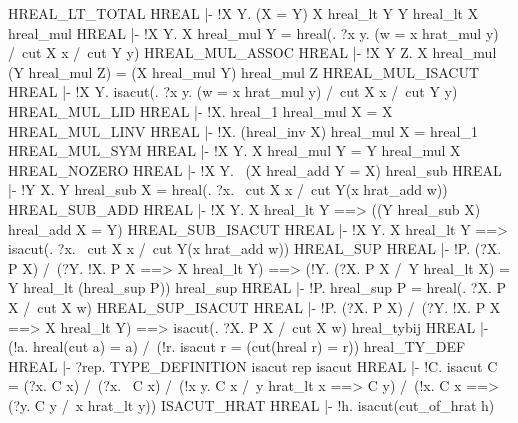 \ENDTHEOREM
\THEOREM HREAL\_LT\_TOTAL HREAL
|- !X Y. (X = Y) \/ X hreal_lt Y \/ Y hreal_lt X
\ENDTHEOREM
\THEOREM hreal\_mul HREAL
|- !X Y.
    X hreal_mul Y =
    hreal(\w. ?x y. (w = x hrat_mul y) /\ cut X x /\ cut Y y)
\ENDTHEOREM
\THEOREM HREAL\_MUL\_ASSOC HREAL
|- !X Y Z. X hreal_mul (Y hreal_mul Z) = (X hreal_mul Y) hreal_mul Z
\ENDTHEOREM
\THEOREM HREAL\_MUL\_ISACUT HREAL
|- !X Y. isacut(\w. ?x y. (w = x hrat_mul y) /\ cut X x /\ cut Y y)
\ENDTHEOREM
\THEOREM HREAL\_MUL\_LID HREAL
|- !X. hreal_1 hreal_mul X = X
\ENDTHEOREM
\THEOREM HREAL\_MUL\_LINV HREAL
|- !X. (hreal_inv X) hreal_mul X = hreal_1
\ENDTHEOREM
\THEOREM HREAL\_MUL\_SYM HREAL
|- !X Y. X hreal_mul Y = Y hreal_mul X
\ENDTHEOREM
\THEOREM HREAL\_NOZERO HREAL
|- !X Y. ~(X hreal_add Y = X)
\ENDTHEOREM
\THEOREM hreal\_sub HREAL
|- !Y X. Y hreal_sub X = hreal(\w. ?x. ~cut X x /\ cut Y(x hrat_add w))
\ENDTHEOREM
\THEOREM HREAL\_SUB\_ADD HREAL
|- !X Y. X hreal_lt Y ==> ((Y hreal_sub X) hreal_add X = Y)
\ENDTHEOREM
\THEOREM HREAL\_SUB\_ISACUT HREAL
|- !X Y.
    X hreal_lt Y ==> isacut(\w. ?x. ~cut X x /\ cut Y(x hrat_add w))
\ENDTHEOREM
\THEOREM HREAL\_SUP HREAL
|- !P.
    (?X. P X) /\ (?Y. !X. P X ==> X hreal_lt Y) ==>
    (!Y. (?X. P X /\ Y hreal_lt X) = Y hreal_lt (hreal_sup P))
\ENDTHEOREM
\THEOREM hreal\_sup HREAL
|- !P. hreal_sup P = hreal(\w. ?X. P X /\ cut X w)
\ENDTHEOREM
\THEOREM HREAL\_SUP\_ISACUT HREAL
|- !P.
    (?X. P X) /\ (?Y. !X. P X ==> X hreal_lt Y) ==>
    isacut(\w. ?X. P X /\ cut X w)
\ENDTHEOREM
\THEOREM hreal\_tybij HREAL
|- (!a. hreal(cut a) = a) /\ (!r. isacut r = (cut(hreal r) = r))
\ENDTHEOREM
\THEOREM hreal\_TY\_DEF HREAL
|- ?rep. TYPE_DEFINITION isacut rep
\ENDTHEOREM
\THEOREM isacut HREAL
|- !C.
    isacut C =
    (?x. C x) /\
    (?x. ~C x) /\
    (!x y. C x /\ y hrat_lt x ==> C y) /\
    (!x. C x ==> (?y. C y /\ x hrat_lt y))
\ENDTHEOREM
\THEOREM ISACUT\_HRAT HREAL
|- !h. isacut(cut_of_hrat h)
\ENDTHEOREM
